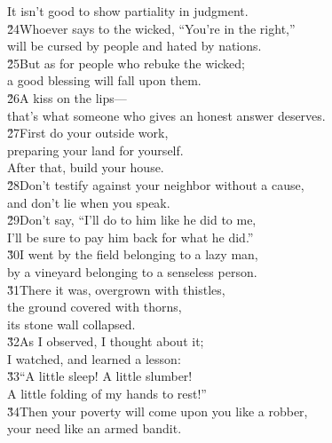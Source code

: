 \begin{poetry}
\poeml It isn't good to show partiality in judgment. \\
\poeml \v{24}Whoever says to the wicked, ``You're in the right,'' \\
\poemlll       will be cursed by people and hated by nations. \\
\poeml \v{25}But as for people who rebuke the wicked; \\
\poemll    a good blessing will fall upon them. \\
\poeml \v{26}A kiss on the lips--- \\
\poemll    that's what someone who gives an honest answer deserves. \\
\poeml \v{27}First do your outside work, \\
\poemll    preparing your land for yourself. \\
\poemlll       After that, build your house. \\
\poeml \v{28}Don't testify against your neighbor without a cause, \\
\poemll    and don't lie when you speak. \\
\poeml \v{29}Don't say, ``I'll do to him like he did to me, \\
\poemll    I'll be sure to pay him back for what he did.'' \\
\poeml \v{30}I went by the field belonging to a lazy man, \\
\poemll    by a vineyard belonging to a senseless person. \\
\poeml \v{31}There it was, overgrown with thistles, \\
\poemll    the ground covered with thorns, \\
\poemlll       its stone wall collapsed. \\
\poeml \v{32}As I observed, I thought about it; \\
\poemll    I watched, and learned a lesson: \\
\poeml \v{33}``A little sleep! A little slumber! \\
\poemll    A little folding of my hands to rest!'' \\
\poeml \v{34}Then your poverty will come upon you like a robber, \\
\poemll    your need like an armed bandit.
\end{poetry}

